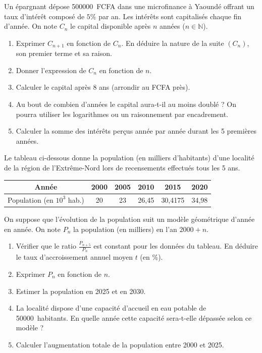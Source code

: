 \documentclass[11pt]{article}
\begin{document}
\begin{exercice}
Un épargnant dépose \SI{500000}{FCFA} dans une microfinance à Yaoundé offrant un taux d'intérêt composé de $5\%$ par an. Les intérêts sont capitalisés chaque fin d'année. On note $C_n$ le capital disponible après $n$ années ($n \in \mathbb{N}$).
\begin{enumerate}
    \item Exprimer $C_{n+1}$ en fonction de $C_n$. En déduire la nature de la suite $(C_n)$, son premier terme et sa raison.
    \item Donner l'expression de $C_n$ en fonction de $n$.
    \item Calculer le capital après 8 ans (arrondir au FCFA près).
    \item Au bout de combien d'années le capital aura-t-il au moins doublé ? On pourra utiliser les logarithmes ou un raisonnement par encadrement.
    \item Calculer la somme des intérêts perçus année par année durant les 5 premières années.
\end{enumerate}
\end{exercice}

\begin{exercice}
Le tableau ci-dessous donne la population (en milliers d'habitants) d'une localité de la région de l'Extrême-Nord lors de recensements effectués tous les 5 ans.

\begin{center}
\begin{tabular}{|c|c|c|c|c|c|}
\hline
Année & 2000 & 2005 & 2010 & 2015 & 2020 \\
\hline
Population (en $10^3$ hab.) & 20 & 23 & 26,45 & 30,4175 & 34,98 \\
\hline
\end{tabular}
\end{center}
On suppose que l'évolution de la population suit un modèle géométrique d'année en année. On note $P_n$ la population (en milliers) en l'an $2000 + n$.
\begin{enumerate}
    \item Vérifier que le ratio $\frac{P_{n+5}}{P_n}$ est constant pour les données du tableau. En déduire le taux d'accroissement annuel moyen $t$ (en \%). 
    \item Exprimer $P_n$ en fonction de $n$.
    \item Estimer la population en 2025 et en 2030.
    \item La localité dispose d'une capacité d'accueil en eau potable de \SI{50000}{habitants}. En quelle année cette capacité sera-t-elle dépassée selon ce modèle ?
    \item Calculer l'augmentation totale de la population entre 2000 et 2025.
\end{enumerate}
\end{exercice}
\end{document}
